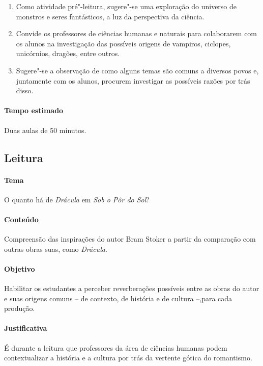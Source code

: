 \documentclass[12pt]{extarticle}
\begin{document}
\begin{enumerate}
\item
Como atividade pré"-leitura, sugere"-se uma exploração do universo de
monstros e seres fantásticos, a luz da perspectiva da ciência. 

\item
Convide os professores de ciências humanas e naturais para colaborarem com os
alunos na investigação das possíveis origens de vampiros, ciclopes,
unicórnios, dragões, entre outros. 

\item
Sugere"-se a observação de como alguns
temas são comuns a diversos povos e, juntamente com os alunos, procurem
investigar as possíveis razões por trás disso.

\end{enumerate}

\paragraph{Tempo estimado} Duas aulas de 50 minutos.


\subsection{Leitura} 

\paragraph{Tema} O quanto há de \emph{Drácula} em \emph{Sob o Pôr do Sol}?

\paragraph{Conteúdo} Compreensão das inspirações do autor Bram Stoker a partir
da comparação com outras obras suas, como \emph{Drácula}.

\paragraph{Objetivo} Habilitar os estudantes a perceber reverberações possíveis 
entre as obras do autor e suas origens comuns -- de contexto, de história e de 
cultura --,para cada produção.

\paragraph{Justificativa} É durante a leitura que professores da área de ciências humanas
podem contextualizar a história e a cultura por trás da vertente gótica
do romantismo.
\end{document}
